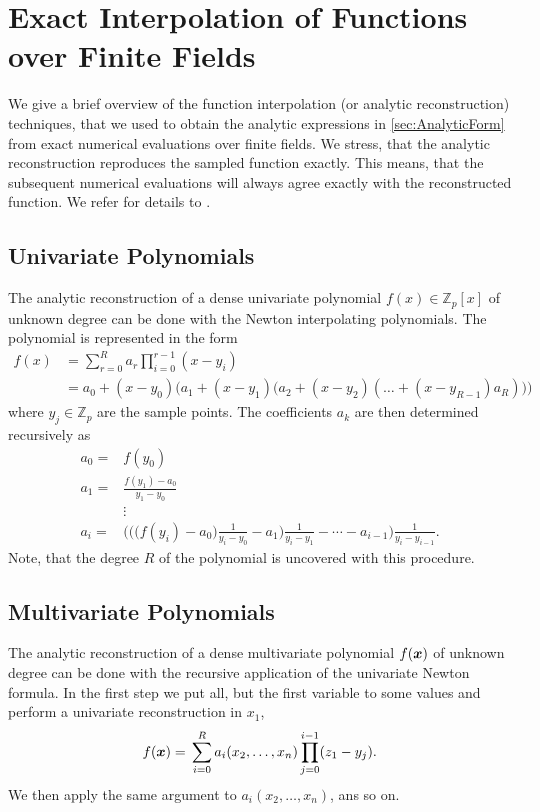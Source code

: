 \section{Exact Interpolation of Functions over Finite Fields}
\label{sec:func_reconstruction}
{
\newcommand{\nn}{\\}
We give a brief overview of the function interpolation (or analytic reconstruction) techniques, that we used to obtain the analytic expressions in \cref{sec:AnalyticForm} from exact numerical evaluations over finite fields.
We stress, that the analytic reconstruction reproduces the sampled function exactly.
This means, that the subsequent numerical evaluations will always agree exactly with the reconstructed function.
We refer for details to \cite{Klappert:2019emp,Peraro:2016wsq,Peraro:2019svx}.

\subsection{Univariate Polynomials}
\label{sec:newton}

The analytic reconstruction of a dense univariate polynomial $f(x) \in \mathbb{Z}_p[x]$ of unknown degree can be done with the Newton interpolating polynomials.
The polynomial is represented in the form
\begin{align*}
  f(x)    &= \sum_{r=0}^Ra_r\prod_{i=0}^{r-1}(x-y_i) \\
  &= a_0 + (x-y_0) 
  \Bigg( 
  a_1 + (x-y_1) 
  \Big( 
  a_2 + (x-y_2) (\dots + (x-y_{R-1})a_R)
  \Big)
  \Bigg)
\end{align*}
where $y_{j} \in \mathbb{Z}_p$ are the sample points.
The coefficients $a_k$ are then determined recursively as 
\begin{align*} %
  a_0 ={}& f(y_0) \nn
  a_1 = {} & \frac{f(y_1)-a_0}{y_1-y_0} \nn
  & \vdots  \\
  a_i = {} & \Bigg(\Big(\big(f(y_i)-a_0\big) \frac{1}{y_i-y_0}-a_1\Big) \frac{1}{y_i-y_1}-\cdots - a_{i-1} \Bigg) \frac{1}{y_i-y_{i-1}}.
\end{align*}
Note, that the degree $R$ of the polynomial is uncovered with this procedure.

\subsection{Multivariate Polynomials}
\label{sec:newton_rec}

The analytic reconstruction of a dense multivariate polynomial $f(\vb*{x})$ of unknown degree can be done with the recursive application of the univariate Newton formula.
In the first step we put all, but the first variable to some values and perform a univariate reconstruction in $x_1$,
\begin{equation} %
  f(\vb*{x}) ={} \sum_{i=0}^R a_i(x_2,\ldots,x_n) \prod_{j=0}^{i-1} (z_1-y_j).
\end{equation}
We then apply the same argument to $a_i(x_2,\ldots,x_n)$, ans so on.

}
